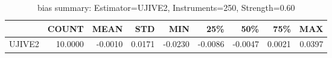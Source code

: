 \begin{table}[ht]
\centering
\caption{bias summary: Estimator=UJIVE2, Instruments=250, Strength=0.60}
\begin{tabular}{lrrrrrrrr}
\toprule
 & COUNT & MEAN & STD & MIN & 25\% & 50\% & 75\% & MAX \\
\midrule
UJIVE2 & 10.0000 & -0.0010 & 0.0171 & -0.0230 & -0.0086 & -0.0047 & 0.0021 & 0.0397 \\
\bottomrule
\end{tabular}
\end{table}

